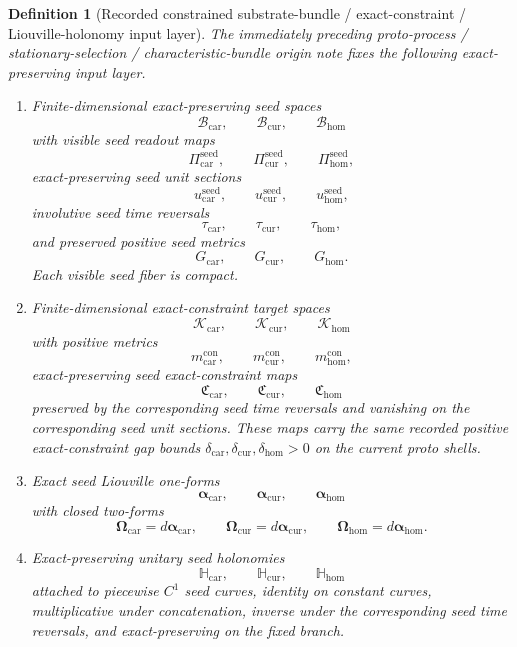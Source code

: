 \documentclass[11pt]{article}
\newcommand{\TensorSeedSpace}{\mathcal B_{\mathrm{car}}}
\newcommand{\CurSeedSpace}{\mathcal B_{\mathrm{cur}}}
\newcommand{\HomSeedSpace}{\mathcal B_{\mathrm{hom}}}
\newcommand{\TensorSeedRead}{\Pi_{\mathrm{car}}^{\mathrm{seed}}}
\newcommand{\CurSeedRead}{\Pi_{\mathrm{cur}}^{\mathrm{seed}}}
\newcommand{\HomSeedRead}{\Pi_{\mathrm{hom}}^{\mathrm{seed}}}
\newcommand{\TensorSeedUnit}{u_{\mathrm{car}}^{\mathrm{seed}}}
\newcommand{\CurSeedUnit}{u_{\mathrm{cur}}^{\mathrm{seed}}}
\newcommand{\HomSeedUnit}{u_{\mathrm{hom}}^{\mathrm{seed}}}
\newcommand{\TensorSeedTimeRev}{\tau_{\mathrm{car}}}
\newcommand{\CurSeedTimeRev}{\tau_{\mathrm{cur}}}
\newcommand{\HomSeedTimeRev}{\tau_{\mathrm{hom}}}
\newcommand{\TensorSeedMetric}{G_{\mathrm{car}}}
\newcommand{\CurSeedMetric}{G_{\mathrm{cur}}}
\newcommand{\HomSeedMetric}{G_{\mathrm{hom}}}
\newcommand{\TensorConstraintTarget}{\mathcal K_{\mathrm{car}}}
\newcommand{\CurConstraintTarget}{\mathcal K_{\mathrm{cur}}}
\newcommand{\HomConstraintTarget}{\mathcal K_{\mathrm{hom}}}
\newcommand{\TensorConstraintMetric}{m_{\mathrm{car}}^{\mathrm{con}}}
\newcommand{\CurConstraintMetric}{m_{\mathrm{cur}}^{\mathrm{con}}}
\newcommand{\HomConstraintMetric}{m_{\mathrm{hom}}^{\mathrm{con}}}
\newcommand{\TensorConstraintMap}{\mathfrak C_{\mathrm{car}}}
\newcommand{\CurConstraintMap}{\mathfrak C_{\mathrm{cur}}}
\newcommand{\HomConstraintMap}{\mathfrak C_{\mathrm{hom}}}
\newcommand{\TensorConstraintGap}{\delta_{\mathrm{car}}}
\newcommand{\CurConstraintGap}{\delta_{\mathrm{cur}}}
\newcommand{\HomConstraintGap}{\delta_{\mathrm{hom}}}
\newcommand{\TensorSeedLiouville}{\boldsymbol{\alpha}_{\mathrm{car}}}
\newcommand{\CurSeedLiouville}{\boldsymbol{\alpha}_{\mathrm{cur}}}
\newcommand{\HomSeedLiouville}{\boldsymbol{\alpha}_{\mathrm{hom}}}
\newcommand{\TensorSeedSymplectic}{\boldsymbol{\Omega}_{\mathrm{car}}}
\newcommand{\CurSeedSymplectic}{\boldsymbol{\Omega}_{\mathrm{cur}}}
\newcommand{\HomSeedSymplectic}{\boldsymbol{\Omega}_{\mathrm{hom}}}
\newcommand{\TensorSeedTransport}{\mathbb H_{\mathrm{car}}}
\newcommand{\CurSeedTransport}{\mathbb H_{\mathrm{cur}}}
\newcommand{\HomSeedTransport}{\mathbb H_{\mathrm{hom}}}
\newtheorem{definition}{Definition}
\begin{document}
\begin{definition}[Recorded constrained substrate-bundle / exact-constraint / Liouville-holonomy input layer]
\label{def:recorded_seed_layer}
The immediately preceding proto-process / stationary-selection / characteristic-bundle origin note fixes the following exact-preserving input layer.
\begin{enumerate}
    \item Finite-dimensional exact-preserving seed spaces
    \[
    \TensorSeedSpace,\qquad
    \CurSeedSpace,\qquad
    \HomSeedSpace
    \]
    with visible seed readout maps
    \[
    \TensorSeedRead,\qquad
    \CurSeedRead,\qquad
    \HomSeedRead,
    \]
    exact-preserving seed unit sections
    \[
    \TensorSeedUnit,\qquad
    \CurSeedUnit,\qquad
    \HomSeedUnit,
    \]
    involutive seed time reversals
    \[
    \TensorSeedTimeRev,\qquad
    \CurSeedTimeRev,\qquad
    \HomSeedTimeRev,
    \]
    and preserved positive seed metrics
    \[
    \TensorSeedMetric,\qquad
    \CurSeedMetric,\qquad
    \HomSeedMetric.
    \]
    Each visible seed fiber is compact.
    \item Finite-dimensional exact-constraint target spaces
    \[
    \TensorConstraintTarget,\qquad
    \CurConstraintTarget,\qquad
    \HomConstraintTarget
    \]
    with positive metrics
    \[
    \TensorConstraintMetric,\qquad
    \CurConstraintMetric,\qquad
    \HomConstraintMetric,
    \]
    exact-preserving seed exact-constraint maps
    \[
    \TensorConstraintMap,\qquad
    \CurConstraintMap,\qquad
    \HomConstraintMap
    \]
    preserved by the corresponding seed time reversals and vanishing on the corresponding seed unit sections. These maps carry the same recorded positive exact-constraint gap bounds \(\TensorConstraintGap,\CurConstraintGap,\HomConstraintGap>0\) on the current proto shells.
    \item Exact seed Liouville one-forms
    \[
    \TensorSeedLiouville,\qquad
    \CurSeedLiouville,\qquad
    \HomSeedLiouville
    \]
    with closed two-forms
    \[
    \TensorSeedSymplectic=d\TensorSeedLiouville,\qquad
    \CurSeedSymplectic=d\CurSeedLiouville,\qquad
    \HomSeedSymplectic=d\HomSeedLiouville.
    \]
    \item Exact-preserving unitary seed holonomies
    \[
    \TensorSeedTransport,\qquad
    \CurSeedTransport,\qquad
    \HomSeedTransport
    \]
    attached to piecewise \(C^1\) seed curves, identity on constant curves, multiplicative under concatenation, inverse under the corresponding seed time reversals, and exact-preserving on the fixed branch.

\end{enumerate}
\end{definition}
\end{document}
